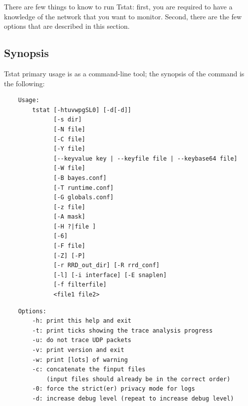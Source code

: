 \documentclass[11pt]{article}
\begin{document}
There are few things to know to run Tstat: first, you are required to have a
knowledge of the network that you want to monitor. 
Second, there are the few options that are described in this section.

\subsection{Synopsis\label{Synopsis}}


Tstat primary usage is as a command-line tool; the synopsis of 
the command is the following:

\begin{small}\begin{verbatim}
    Usage:
        tstat [-htuvwpgSL0] [-d[-d]]
              [-s dir]
              [-N file]
              [-C file]
              [-Y file]
              [--keyvalue key | --keyfile file | --keybase64 file]                                                              
              [-W file]
              [-B bayes.conf]
              [-T runtime.conf]
              [-G globals.conf]                                   
              [-z file]
              [-A mask]
              [-H ?|file ]
              [-6]                                                
              [-F file]                                           
              [-Z] [-P]
              [-r RRD_out_dir] [-R rrd_conf]
              [-l] [-i interface] [-E snaplen]
              [-f filterfile]
              <file1 file2>
\end{verbatim}\end{small} \noindent
\begin{small}\begin{verbatim}
    Options:
        -h: print this help and exit
        -t: print ticks showing the trace analysis progress
        -u: do not trace UDP packets
        -v: print version and exit
        -w: print [lots] of warning
        -c: concatenate the finput files
            (input files should already be in the correct order)
        -0: force the strict(er) privacy mode for logs
        -d: increase debug level (repeat to increase debug level)
\end{verbatim}\end{small} \noindent
\end{document}

